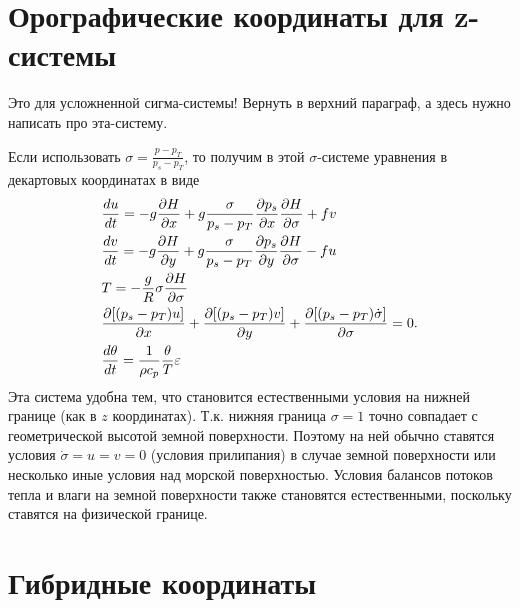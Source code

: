 \section{Орографические координаты для z-системы}
   \begin{warn}
        Это для усложненной сигма-системы! Вернуть в верхний параграф, а здесь нужно написать про эта-систему.
   \end{warn}

Если использовать $\sigma=\frac{p-p_T}{p_s-p_T}$, то получим в этой $\sigma$-системе уравнения в декартовых координатах в виде
\begin{align}
    \label{eq:dudt2nabla}
    &\displaystyle\frac{d u}{d t} = -g\displaystyle\frac{\partial H}{\partial x}+g\frac{\sigma}{p_s-p_T}\displaystyle\frac{\partial p_s}{\partial x}\displaystyle\frac{\partial H}{\partial \sigma}+fv \\
    \label{eq:dvdt2nabla}
    &\displaystyle\frac{d v}{d t} = -g\displaystyle\frac{\partial H}{\partial y}+g\frac{\sigma}{p_s-p_T}\displaystyle\frac{\partial p_s}{\partial y}\displaystyle\frac{\partial H}{\partial \sigma}-fu \\
    \label{eq:hydrostat2nabla}
    &T=-\frac{g}{R}\sigma\displaystyle\frac{\partial H}{\partial \sigma} \\
    \label{eq:consm2nabla}
    &\displaystyle\frac{\partial [(p_s-p_T)u]}{\partial x} + \displaystyle\frac{\partial [(p_s-p_T)v]}{\partial y} + \displaystyle\frac{\partial [(p_s-p_T)\dot{\sigma}]}{\partial \sigma} = 0. \\
    \label{eq:temp2nabla}
    &\displaystyle\frac{d \theta}{d t}=\frac{1}{\rho c_p}\frac{\theta}{T}\varepsilon 
\end{align}
Эта система удобна тем, что становится естественными условия на нижней границе (как в $z$ координатах). Т.к. нижняя граница $\sigma=1$ точно совпадает с геометрической высотой земной поверхности. Поэтому на ней обычно ставятся условия $\dot{\sigma}=u=v=0$ (условия прилипания) в случае земной поверхности или несколько иные условия над морской поверхностью. Условия балансов потоков тепла и влаги на земной поверхности также становятся естественными, поскольку ставятся на физической границе. 



\section{Гибридные координаты}

